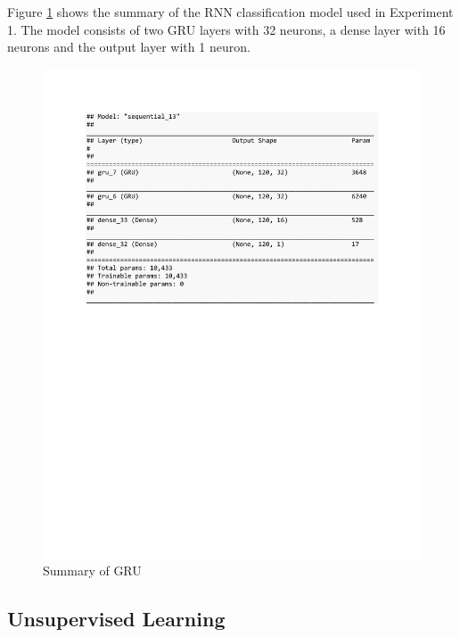 Figure \ref{fig:summary_GRU_class_syn} shows the summary of the RNN classification model used in Experiment 1. The model consists of two GRU layers with 32 neurons, a dense layer with 16 neurons and the output layer with 1 neuron. 

\begin{figure}[h]
	\centering
	\includegraphics[scale=0.5]{Figures/summary_GRU_class_syn}
	\decoRule
	\caption[Experiment 1: Summary of GRU for supervised learning]{Summary of GRU \parencite{own}}
	\label{fig:summary_GRU_class_syn}
\end{figure}

\clearpage
\subsection{Unsupervised Learning}

